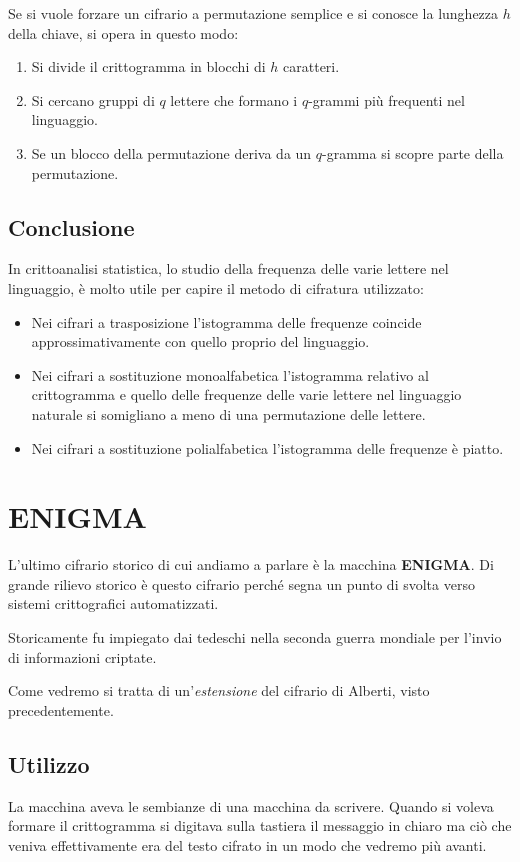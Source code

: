 Se si vuole forzare un cifrario a permutazione semplice e si conosce la lunghezza $h$ della chiave, si opera in questo
modo:
\begin{enumerate}
	\item Si divide il crittogramma in blocchi di $h$ caratteri.
	\item Si cercano gruppi di $q$ lettere che formano i $q$-grammi pi\`u frequenti nel linguaggio.
	\item Se un blocco della permutazione deriva da un $q$-gramma si scopre parte della permutazione.
\end{enumerate}

\subsection{Conclusione}
In crittoanalisi statistica, lo studio della frequenza delle varie lettere nel linguaggio, \`e molto utile per capire
il metodo di cifratura utilizzato:
\begin{itemize}
	\item Nei cifrari a trasposizione l'istogramma delle frequenze coincide approssimativamente con quello proprio del
	      linguaggio.
	\item Nei cifrari a sostituzione monoalfabetica l'istogramma relativo al crittogramma e quello delle frequenze delle
	      varie lettere nel linguaggio naturale si somigliano a meno di una permutazione delle lettere.
	\item Nei cifrari a sostituzione polialfabetica l'istogramma delle frequenze \`e piatto.
\end{itemize}

\section{ENIGMA}\label{ENIGMA}
L'ultimo cifrario storico di cui andiamo a parlare \`e la macchina \textbf{ENIGMA}. Di grande rilievo storico \`e questo
cifrario perch\'e segna un punto di svolta verso sistemi crittografici automatizzati.

Storicamente fu impiegato dai tedeschi nella seconda guerra mondiale per l'invio di informazioni criptate.

Come vedremo si tratta di un'\emph{estensione} del cifrario di Alberti, visto precedentemente.

\subsection{Utilizzo}
La macchina aveva le sembianze di una macchina da scrivere. Quando si voleva formare il crittogramma si digitava sulla
tastiera il messaggio in chiaro ma ci\`o che veniva effettivamente era del testo cifrato in un modo che vedremo pi\`u
avanti.

